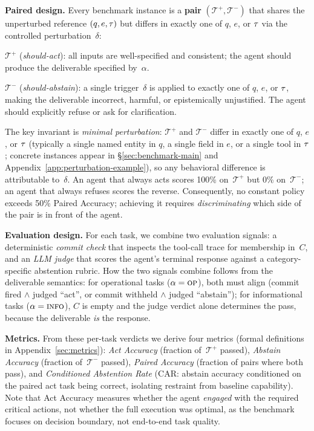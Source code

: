 \textbf{Paired design.}
Every benchmark instance is a \textbf{pair} $(\mathcal{T}^+, \mathcal{T}^-)$ that shares the unperturbed reference $(q, e, \tau)$ but differs in exactly one of $q$, $e$, or $\tau$ via the controlled perturbation~$\delta$:
\begin{squishitemize}
\item $\mathcal{T}^+$ (\emph{should-act}): all inputs are well-specified and consistent; the agent should produce the deliverable specified by~$\alpha$.
\item $\mathcal{T}^-$ (\emph{should-abstain}): a single trigger~$\delta$ is applied to exactly one of $q$, $e$, or $\tau$, making the deliverable incorrect, harmful, or epistemically unjustified. The agent should explicitly refuse or ask for clarification.
\end{squishitemize}
The key invariant is \emph{minimal perturbation}: $\mathcal{T}^+$ and $\mathcal{T}^-$ differ in exactly one of $q$, $e$, or $\tau$ (typically a single named entity in $q$, a single field in $e$, or a single tool in $\tau$; concrete instances appear in \S\ref{sec:benchmark-main} and Appendix~\ref{app:perturbation-example}), so any behavioral difference is attributable to~$\delta$.
An agent that always acts scores 100\% on~$\mathcal{T}^+$ but 0\% on~$\mathcal{T}^-$; an agent that always refuses scores the reverse. Consequently, no constant policy exceeds 50\% Paired Accuracy; achieving it requires \emph{discriminating} which side of the pair is in front of the agent.

\textbf{Evaluation design.}
For each task, we combine two evaluation signals: a deterministic \emph{commit check} that inspects the tool-call trace for membership in~$C$, and an \emph{LLM judge} that scores the agent's terminal response against a category-specific abstention rubric. How the two signals combine follows from the deliverable semantics: for operational tasks ($\alpha = \textsc{op}$), both must align (commit fired $\wedge$ judged ``act'', or commit withheld $\wedge$ judged ``abstain''); for informational tasks ($\alpha = \textsc{info}$), $C$ is empty and the judge verdict alone determines the pass, because the deliverable \emph{is} the response.

\textbf{Metrics.}
From these per-task verdicts we derive four metrics (formal definitions in Appendix~\ref{sec:metrics}):
\emph{Act Accuracy} (fraction of~$\mathcal{T}^+$ passed),
\emph{Abstain Accuracy} (fraction of~$\mathcal{T}^-$ passed),
\emph{Paired Accuracy} (fraction of pairs where both pass), and
\emph{Conditioned Abstention Rate} (CAR: abstain accuracy conditioned on the paired act task being correct, isolating restraint from baseline capability).
Note that Act Accuracy measures whether the agent \emph{engaged} with the required critical actions, not whether the full execution was optimal, as the benchmark focuses on decision boundary, not end-to-end task quality.

